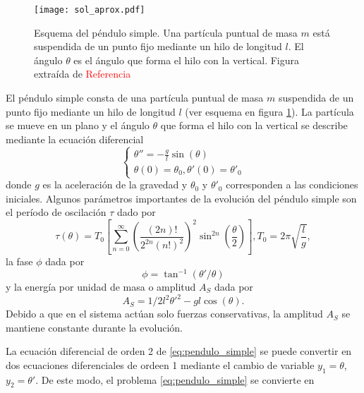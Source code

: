 \documentclass[aps,prb,twocolumn,superscriptaddress,floatfix,longbibliography]{revtex4-2}
\newif\ifptitle
\newif\ifpnumber
\newcounter{para}
\newcommand\ptitle[1]{\par\refstepcounter{para}
{\ifpnumber{\noindent\textcolor{lightgray}{\textbf{\thepara}}\indent}\fi}
{\ifptitle{\textbf{[{#1}]}}\fi}}
\begin{document}
\ptitle{Presentar ecuaciones de la dinámica}

\begin{figure}[h]
  \texttt{[image: sol\_aprox.pdf]}
  \caption{Esquema del péndulo simple. Una partícula puntual de masa $m$ está suspendida de un punto fijo mediante un hilo de longitud $l$. El ángulo $\theta$ es el ángulo que forma el hilo con la vertical. Figura extraída de \textcolor{red}{Referencia}}
   \label{fig:simple_esquema}
\end{figure}

El péndulo simple consta de una partícula puntual de masa $m$ suspendida de un punto fijo mediante un hilo de longitud $l$ (ver esquema en figura \ref{fig:simple_esquema}). La partícula se mueve en un plano y el ángulo $\theta$ que forma el hilo con la vertical se describe mediante la ecuación diferencial
\begin{equation}
  \left\{\begin{matrix}
    \theta'' = -\frac{g}{l} \sin{(\theta)} \\
    \theta(0) = \theta_0, \theta'(0) = \theta'_0
   \end{matrix}\right.
  \label{eq:pendulo_simple}
\end{equation}
donde $g$ es la aceleración de la gravedad y $\theta_0$ y $\theta'_0$ corresponden a las condiciones iniciales. Algunos parámetros importantes de la evolución del péndulo simple son el período de oscilación $\tau$ dado por
\begin{equation}
  \tau(\theta) = T_0 \left [ \sum_{n = 0}^\infty \left(  \frac{(2n)!}{2^{2n}(n!)^2} \right )^2 \sin^{2n} \left ( \frac{\theta}{2} \right )   \right ], T_0 = 2 \pi \sqrt{\frac{l}{g}},
  \label{eq:periodo_simple}
\end{equation}
la fase $\phi$ dada por
\begin{equation}
  \phi = \tan^{-1}(\theta'/\theta)
  \label{eq:fase_simple}
\end{equation}
y la energía por unidad de masa o amplitud $A_S$ dada por
\begin{equation}
  A_S = 1/2 l^2 \theta'^2 - g l \cos{(\theta)}.
  \label{eq:amplitud_simple}
\end{equation}
Debido a que en el sistema actúan solo fuerzas conservativas, la amplitud $A_S$ se mantiene constante durante la evolución.

La ecuación diferencial de orden 2 de \ref{eq:pendulo_simple} se puede convertir en dos ecuaciones diferenciales de ordeen 1 mediante el cambio de variable $y_1 = \theta$, $y_2 = \theta'$. De este modo, el problema \ref{eq:pendulo_simple} se convierte en
\end{document}
